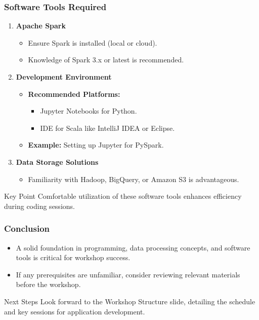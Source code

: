 \documentclass[aspectratio=169]{beamer}
\begin{document}
\begin{frame}[fragile]
    \frametitle{Software Tools Required}
    \begin{enumerate}
        \item \textbf{Apache Spark}
            \begin{itemize}
                \item Ensure Spark is installed (local or cloud).
                \item Knowledge of Spark 3.x or latest is recommended.
            \end{itemize}

        \item \textbf{Development Environment}
            \begin{itemize}
                \item \textbf{Recommended Platforms:}
                \begin{itemize}
                    \item Jupyter Notebooks for Python.
                    \item IDE for Scala like IntelliJ IDEA or Eclipse.
                \end{itemize}
                \item \textbf{Example:} Setting up Jupyter for PySpark.
            \end{itemize}

        \item \textbf{Data Storage Solutions}
            \begin{itemize}
                \item Familiarity with Hadoop, BigQuery, or Amazon S3 is advantageous.
            \end{itemize}
    \end{enumerate}
    \begin{block}{Key Point}
        Comfortable utilization of these software tools enhances efficiency during coding sessions.
    \end{block}
\end{frame}

\begin{frame}[fragile]
    \frametitle{Conclusion}
    \begin{itemize}
        \item A solid foundation in programming, data processing concepts, and software tools is critical for workshop success.
        \item If any prerequisites are unfamiliar, consider reviewing relevant materials before the workshop.
    \end{itemize}
    \begin{block}{Next Steps}
        Look forward to the Workshop Structure slide, detailing the schedule and key sessions for application development.
    \end{block}
\end{frame}
\end{document}
